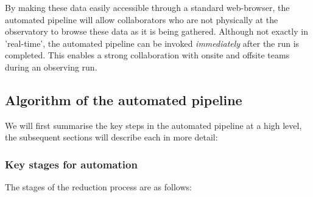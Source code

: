 By making these data easily accessible through a standard web-browser, the automated pipeline will allow collaborators who are not physically at the observatory to browse these data as it is being gathered. Although not exactly in 'real-time', the automated pipeline can be invoked \emph{immediately} after the run is completed.  This enables a strong collaboration with onsite and offsite teams during an observing run. 

\subsection{Algorithm of the automated pipeline} 
We will first summarise the key steps in the automated pipeline at a high level, the subsequent sections will describe each in more detail:

\subsubsection{Key stages for automation}
The stages of the reduction process are as follows:
